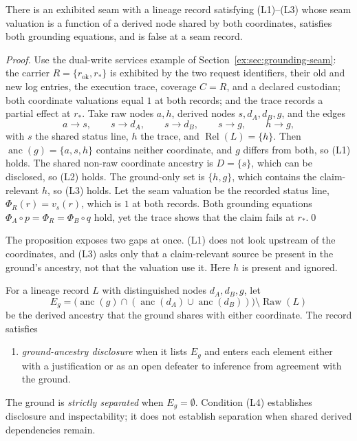 \documentclass[twocolumn,envcountsect,envcountsame,natbib]{svjour3}
\begin{document}
\begin{proposition}\label{ex:prop:laundering}
There is an exhibited seam with a lineage record satisfying (L1)--(L3) whose seam valuation is a function of a derived node shared by both coordinates, satisfies both grounding equations, and is false at a seam record.
\end{proposition}
\begin{proof}
Use the dual-write services example of Section~\ref{ex:sec:grounding-seam}: the carrier $R=\{r_{\mathrm{ok}},r_*\}$ is exhibited by the two request identifiers, their old and new log entries, the execution trace, coverage $C=R$, and a declared custodian; both coordinate valuations equal $1$ at both records; and the trace records a partial effect at $r_*$. Take raw nodes $a,h$, derived nodes $s,d_A,d_B,g$, and the edges
\[
a\to s,\qquad s\to d_A,\qquad s\to d_B,\qquad s\to g,\qquad h\to g,
\]
with $s$ the shared status line, $h$ the trace, and $\operatorname{Rel}(L)=\{h\}$. Then $\operatorname{anc}(g)=\{a,s,h\}$ contains neither coordinate, and $g$ differs from both, so (L1) holds. The shared non-raw coordinate ancestry is $D=\{s\}$, which can be disclosed, so (L2) holds. The ground-only set is $\{h,g\}$, which contains the claim-relevant $h$, so (L3) holds. Let the seam valuation be the recorded status line, $\Phi_R(r)=v_s(r)$, which is $1$ at both records. Both grounding equations $\Phi_A\circ p=\Phi_R=\Phi_B\circ q$ hold, yet the trace shows that the claim fails at $r_*$.\qed
\end{proof}

The proposition exposes two gaps at once. (L1) does not look upstream of the coordinates, and (L3) asks only that a claim-relevant source be present in the ground's ancestry, not that the valuation use it. Here $h$ is present and ignored.

\begin{definition}\label{ex:def:separation}
For a lineage record $L$ with distinguished nodes $d_A,d_B,g$, let
\[
E_g=\bigl(\operatorname{anc}(g)\cap(\operatorname{anc}(d_A)\cup\operatorname{anc}(d_B))\bigr)\setminus\operatorname{Raw}(L)
\]
be the derived ancestry that the ground shares with either coordinate. The record satisfies
\begin{enumerate}
\item[(L4)] \emph{ground-ancestry disclosure} when it lists $E_g$ and enters each element either with a justification or as an open defeater to inference from agreement with the ground.
\end{enumerate}
The ground is \emph{strictly separated} when $E_g=\emptyset$. Condition (L4) establishes disclosure and inspectability; it does not establish separation when shared derived dependencies remain.
\end{definition}
\end{document}
